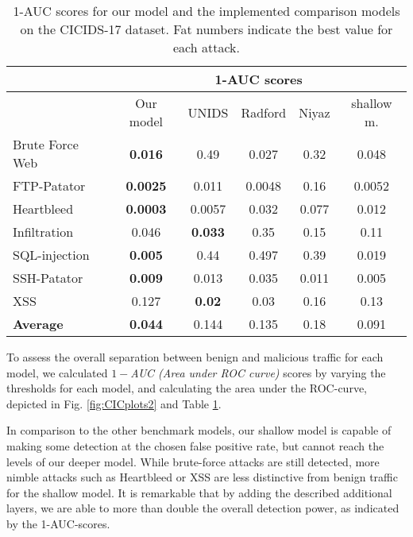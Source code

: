 \begin{table}[ht]
\centering
\begin{tabular}{l|c|ccc|c}
\multicolumn{1}{c|}{ }&\multicolumn{5}{c}{1-AUC scores}\\

  \hline
  & Our model&UNIDS&Radford&Niyaz&shallow m.\\ 
  \hline
Brute Force Web & \textbf{0.016}&0.49&0.027&0.32 &0.048 \\ 
  FTP-Patator & \textbf{0.0025}&0.011&0.0048&0.16 &0.0052\\ 
  Heartbleed  & \textbf{0.0003}&0.0057&0.032&0.077 &0.012\\ 
  Infiltration &0.046& \textbf{0.033}&0.35&0.15&0.11\\ 
  SQL-injection & \textbf{0.005}&0.44&0.497&0.39&0.019\\ 
  SSH-Patator & \textbf{0.009}&0.013&0.035&0.011&0.005\\ 
  XSS &0.127&\textbf{0.02}&0.03&0.16&0.13\\ 
   \hline
\textbf{Average}&\textbf{0.044} & 0.144&0.135&0.18 &0.091 \\
\end{tabular}
\vspace{2pt}
\caption{1-AUC scores for our model and the implemented comparison models on the CICIDS-17 dataset. Fat numbers indicate the best value for each attack.}%
\label{tab:dfCICinf}
\end{table}

To assess the overall separation between benign and malicious traffic for each model, we calculated $1-$\emph{AUC (Area under ROC curve)} scores by varying the thresholds for each model, and calculating the area under the ROC-curve, depicted in Fig. \ref{fig:CICplots2} and Table \ref{tab:dfCICinf}. 

In comparison to the other benchmark models, our shallow model is capable of making some detection at the chosen false positive rate, but cannot reach the levels of our deeper model.  While brute-force attacks are still detected, more nimble attacks such as Heartbleed or XSS are less distinctive from benign traffic for the shallow model.
It is remarkable that by adding the described additional layers, we are able to more than double the overall detection power, as indicated by the 1-AUC-scores.


